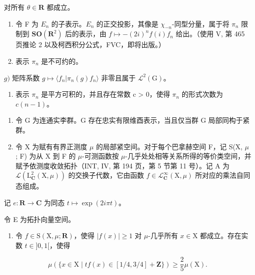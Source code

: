 对所有 \(\theta\in\mathbf{R}\) 都成立。

\begin{enumerate}
\def\labelenumi{\alph{enumi})}
\setcounter{enumi}{4}
\item
  令 F 为 \(E_{n}\) 的子表示。\(E_{n}\) 的正交投影，其像是 \(\chi_{-n}\)-同型分量，属于将 \(\pi_{n}\) 限制到 \(\mathbf{SO}(\mathbf{R}^{2})\) 后的表示，由 \(f \mapsto -(2i)^{n}f(i)f_{n}\) 给出。（使用 V, 第 465 页推论 2 以及柯西积分公式，FVC，即将出版。）
\item
  表示 \(\pi_n\) 是不可约的。
\end{enumerate}

\(g)\) 矩阵系数 \(g \mapsto \langle f_n | \pi_n(g)f_n \rangle\) 非零且属于 \(\mathcal{L}^2(\mathrm{G})\)。

\begin{enumerate}
\def\labelenumi{\alph{enumi})}
\setcounter{enumi}{7}
\tightlist
\item
  表示 \(\pi_{n}\) 是平方可积的，并且存在常数 c > 0，使得 \(\pi_{n}\) 的形式次数为 \(c(n - 1)\)。
\end{enumerate}

\begin{enumerate}
\def\labelenumi{\arabic{enumi})}
\setcounter{enumi}{16}
\item
  令 G 为连通实李群。G 存在忠实有限维酉表示，当且仅当群 G 局部同构于紧群。
\item
  令 X 为赋有有界正测度 \(\mu\) 的局部紧空间。对于每个巴拿赫空间 F，记 S(X, \(\mu\) ; F) 为从 X 到 F 的 \(\mu\)-可测函数按 \(\mu\)-几乎处处相等关系所得的等价类空间，并赋予依测度收敛拓扑（INT, IV, 第 194 页，第 5 节第 11 号）。记 A 为 \(\mathcal{L}(\mathrm{L}_{\mathbf{C}}^{2}(\mathrm{X},\mu))\) 的交换子代数，它由函数 \(f \in \mathcal{L}_{\mathbf{C}}^{\infty}(\mathrm{X},\mu)\) 所对应的乘法自同态组成。
\end{enumerate}

记 \(e\colon \mathbf{R}\to \mathbf{C}\) 为同态 \(t\mapsto \exp (2i\pi t)\)。

令 E 为拓扑向量空间。

\begin{enumerate}
\def\labelenumi{\alph{enumi})}
\tightlist
\item
  令 \(f \in \mathrm{S}(\mathrm{X}, \mu; \mathbf{R})\)，使得 \(|f(x)| \geqslant 1\) 对 \(\mu\)-几乎所有 \(x \in \mathrm{X}\) 都成立。存在实数 \(t \in ]0, 1[\)，使得
\end{enumerate}

\[
\mu (\{x \in \mathrm{X} \mid t f (x) \in [ 1 / 4, 3 / 4 ] + \mathbf {Z} \}) \geqslant \frac {2}{5} \mu (\mathrm{X}).
\]

